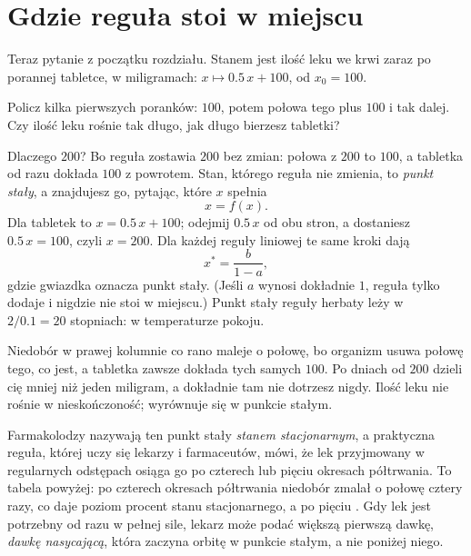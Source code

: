 \section{Gdzie reguła stoi w miejscu}
\label{sec:ch02-fixed}

\noindent
Teraz pytanie z początku rozdziału. Stanem jest ilość leku we krwi zaraz po
porannej tabletce, w miligramach: $x \mapsto \num{0.5}\,x + 100$, od
$x_0 = 100$.

\begin{think}
Policz kilka pierwszych poranków: $100$, potem połowa tego plus $100$ i tak
dalej. Czy ilość leku rośnie tak długo, jak długo bierzesz tabletki?
\end{think}
Dlaczego $200$? Bo reguła zostawia $200$ bez zmian: połowa z $200$ to
$100$, a tabletka od razu dokłada $100$ z powrotem. Stan, którego reguła nie
zmienia, to \emph{punkt stały}, a znajdujesz go, pytając, które $x$ spełnia
\[ x = f(x) . \]
Dla tabletek to $x = \num{0.5}\,x + 100$; odejmij $\num{0.5}\,x$ od obu
stron, a dostaniesz $\num{0.5}\,x = 100$, czyli $x = 200$. Dla każdej
reguły liniowej te same kroki dają
\[ x^{*} = \frac{b}{1 - a} , \]
gdzie gwiazdka oznacza punkt stały. (Jeśli $a$ wynosi dokładnie $1$,
reguła tylko dodaje i nigdzie nie stoi w miejscu.) Punkt stały reguły
herbaty leży w $2 / \num{0.1} = 20$ stopniach: w temperaturze pokoju.



\noindent
Niedobór w prawej kolumnie co rano maleje o połowę, bo organizm usuwa
połowę tego, co jest, a tabletka zawsze dokłada tych samych $100$. Po
 dniach od $200$ dzieli cię mniej niż jeden miligram,
a dokładnie tam nie dotrzesz nigdy. Ilość leku nie rośnie w nieskończoność;
wyrównuje się w punkcie stałym.

\begin{worldbox}
Farmakolodzy nazywają ten punkt stały \emph{stanem stacjonarnym}, a
praktyczna reguła, której uczy się lekarzy i farmaceutów, mówi, że lek
przyjmowany w regularnych odstępach osiąga go po czterech lub pięciu
okresach półtrwania. To tabela powyżej: po czterech okresach półtrwania
niedobór zmalał o połowę cztery razy, co daje poziom 
procent stanu stacjonarnego, a po pięciu . Gdy lek jest
potrzebny od razu w pełnej sile, lekarz może podać większą pierwszą dawkę,
\emph{dawkę nasycającą}, która zaczyna orbitę w punkcie stałym, a nie
poniżej niego.
\end{worldbox}

